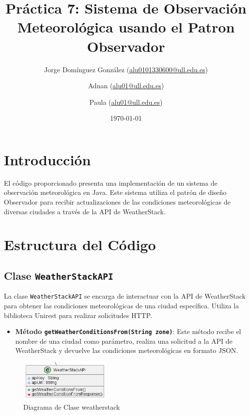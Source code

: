 \documentclass{article}
\title{\Huge \textbf{Práctica 7: Sistema de Observación Meteorológica usando el Patron Observador}}
\author{
  Jorge Domínguez González (\href{mailto:alu0101330600@ull.edu.es}{alu0101330600@ull.edu.es}) \and
  Adnan (\href{mailto:Alu01@ull.edu.es}{alu01@ull.edu.es}) \and
  Paula (\href{mailto:alu01@ull.edu.es}{alu01@ull.edu.es})
}
\date{\today}
\begin{document}
\maketitle

\tableofcontents
\listoffigures
\newpage

\section{Introducción}
El código proporcionado presenta una implementación de un sistema de observación meteorológica en Java. Este sistema utiliza el patrón de diseño Observador para recibir actualizaciones de las condiciones meteorológicas de diversas ciudades a través de la API de WeatherStack.

\section{Estructura del Código}

\subsection{Clase \texttt{WeatherStackAPI}}
La clase \texttt{WeatherStackAPI} se encarga de interactuar con la API de WeatherStack para obtener las condiciones meteorológicas de una ciudad específica. Utiliza la biblioteca Unirest para realizar solicitudes HTTP.

\begin{itemize}
    \item \textbf{Método \texttt{getWeatherConditionsFrom(String zone)}}: Este método recibe el nombre de una ciudad como parámetro, realiza una solicitud a la API de WeatherStack y devuelve las condiciones meteorológicas en formato JSON.
\end{itemize}

\begin{figure}[H]
    \centering
    \includegraphics[width=0.4\textwidth]{weatherstack.png}
    \caption{Diagrama de Clase weatherstack}
    \label{figura:weatherstack}
\end{figure}
\end{document}
